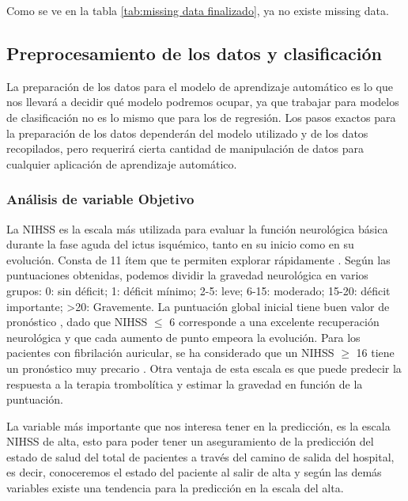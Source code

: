     Como se ve en la tabla \ref{tab:missing data finalizado}, ya no existe missing data.

    \hypertarget{preprocesamiento-de-los-datos-y-clasificaciuxf3n}{%
\subsection{Preprocesamiento de los datos y
clasificación}\label{preprocesamiento-de-los-datos-y-clasificaciuxf3n}}

La preparación de los datos para el modelo de aprendizaje automático es
lo que nos llevará a decidir qué modelo podremos ocupar, ya que trabajar
para modelos de clasificación no es lo mismo que para los de regresión.
Los pasos exactos para la preparación de los datos dependerán del modelo
utilizado y de los datos recopilados, pero requerirá cierta cantidad de
manipulación de datos para cualquier aplicación de aprendizaje
automático.

    \hypertarget{anuxe1lisis-de-variable-objetivo}{%
\subsubsection{Análisis de variable
Objetivo}\label{anuxe1lisis-de-variable-objetivo}}

La NIHSS es la escala más utilizada para evaluar la función neurológica
básica durante la fase aguda del ictus isquémico, tanto en su inicio
como en su evolución. Consta de 11 ítem que te permiten explorar
rápidamente \cite{cien2001}.
Según las puntuaciones obtenidas, podemos dividir la gravedad
neurológica en varios grupos: 0: sin déficit; 1: déficit mínimo; 2-5:
leve; 6-15: moderado; 15-20: déficit importante; \textgreater20:
Gravemente. La puntuación global inicial tiene buen
valor de pronóstico \cite{Adams1993}, dado que NIHSS $\leq$ 6
corresponde a una excelente recuperación neurológica y que cada aumento
de punto empeora la evolución. Para los pacientes con fibrilación
auricular, se ha considerado que un NIHSS $\geq$ 16 tiene un pronóstico muy
precario \cite{Meyer2009}. Otra ventaja de esta escala es que puede
predecir la respuesta a la terapia trombolítica y estimar la gravedad en
función de la puntuación.

La variable más importante que nos interesa tener en la predicción, es
la escala NIHSS de alta, esto para poder tener un aseguramiento de la
predicción del estado de salud del total de pacientes a través del
camino de salida del hospital, es decir, conoceremos el estado del
paciente al salir de alta y según las demás variables existe una
tendencia para la predicción en la escala del alta.

